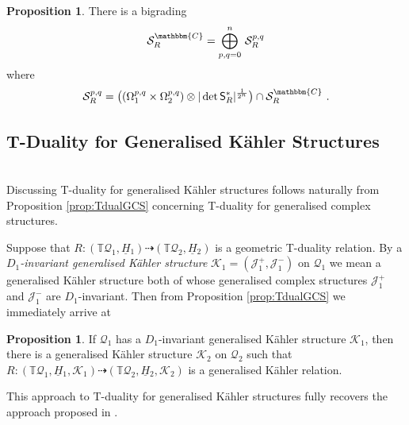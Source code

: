 \documentclass[a4paper, reqno, 11pt]{amsart}
\numberwithin{equation}{section}
\theoremstyle{definition}
\newtheorem{proposition}[equation]{Proposition}
\newcommand{\red}[1]{\underline{#1}}
\newcommand{\IC}{\mathbbm{C}}
\newcommand{\IT}{\mathbb{T}}
\newcommand{\cS}{{\mathcal S}}
\newcommand{\cQ}{{\mathcal Q}}
\newcommand{\cK}{{\mathcal K}}
\newcommand{\cJ}{{\mathcal J}}
\newcommand{\sfS}{{\mathsf{S}}}
\newcommand{\rel}{\dashrightarrow}
\theoremstyle{remark}
\begin{document}
\begin{proposition}\label{prop:bigradingGKR}
    There is a bigrading 
    \begin{align}
        \cS_R^\IC = \bigoplus_{p,q=0}^n\, \cS_R^{p,q}
    \end{align}
    where $$\cS_R^{p,q} = \big((\Omega_1^{p,q} \times \Omega_2^{p,q}) \otimes |\det \sfS_R^* |^{\frac{1}{2^n}}\big) \cap \cS_R^\IC \ . $$
\end{proposition}

\medskip

\subsection{T-Duality for Generalised K\"{a}hler Structures}~\\[5pt]
Discussing T-duality for generalised K{\"a}hler structures follows naturally from Proposition \ref{prop:TdualGCS} concerning T-duality for generalised complex structures.

Suppose that $R \colon (\IT \cQ_1 , \red H{}_1) \rel (\IT \cQ_2, \red H{}_2)$ is a geometric T-duality relation. By a \emph{$D_1$-invariant generalised K\"ahler structure} $\cK_1=(\cJ_1^+,\cJ_1^-)$ on $\cQ_1$ we mean a generalised K\"ahler structure both of whose generalised complex structures $\cJ_1^+$ and $\cJ_1^-$ are $D_1$-invariant. Then from Proposition \ref{prop:TdualGCS} we immediately arrive at

\begin{proposition}\label{prop:TdualGKS}
    If $\cQ_1$ has a $D_1$-invariant generalised K\"ahler structure $\cK_1$, then there is a generalised K\"ahler structure $\cK_2$ on $\cQ_2$ such that $R \colon (\IT \cQ_1, \red H{}_1, \cK_1) \rel (\IT \cQ_2, \red H{}_2, \cK_2)$ is a generalised K\"ahler relation.
\end{proposition}

This approach to T-duality for generalised K{\"a}hler structures fully recovers the approach proposed in \cite{Lindstrom:2007sq}.
\end{document}
